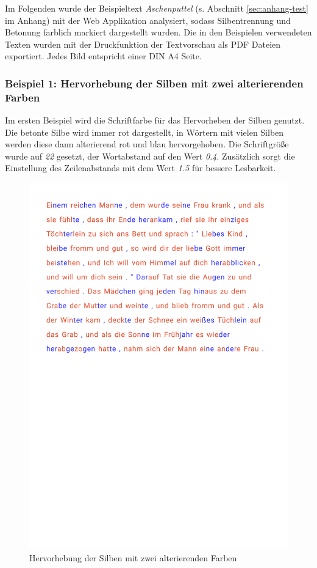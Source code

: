 Im Folgenden wurde der Beispieltext \textit{Aschenputtel} (s. Abschnitt \ref{sec:anhang-test} im Anhang) mit der Web Applikation analysiert, sodass Silbentrennung und Betonung farblich markiert dargestellt wurden. Die in den Beispielen verwendeten Texten wurden mit der Druckfunktion der Textvorschau als PDF Dateien exportiert. Jedes Bild entspricht einer DIN A4 Seite.

\subsubsection{Beispiel 1: Hervorhebung der Silben mit zwei alterierenden Farben}

Im ersten Beispiel wird die Schriftfarbe für das Hervorheben der Silben genutzt. Die betonte Silbe wird immer rot dargestellt, in Wörtern mit vielen Silben werden diese dann alterierend rot und blau hervorgehoben. Die Schriftgröße wurde auf \textit{22} gesetzt, der Wortabstand auf den Wert \textit{0.4}. Zusätzlich sorgt die Einstellung des Zeilenabstands mit dem Wert \textit{1.5} für bessere Lesbarkeit.

\begin{figure}[h!]
	\centering
	\includegraphics[width=.7\linewidth, frame]{figures/evaluation/annotation1}
	\caption{Hervorhebung der Silben mit zwei alterierenden Farben}
	\label{fig:evaluation-ex1}
\end{figure}
\newpage

